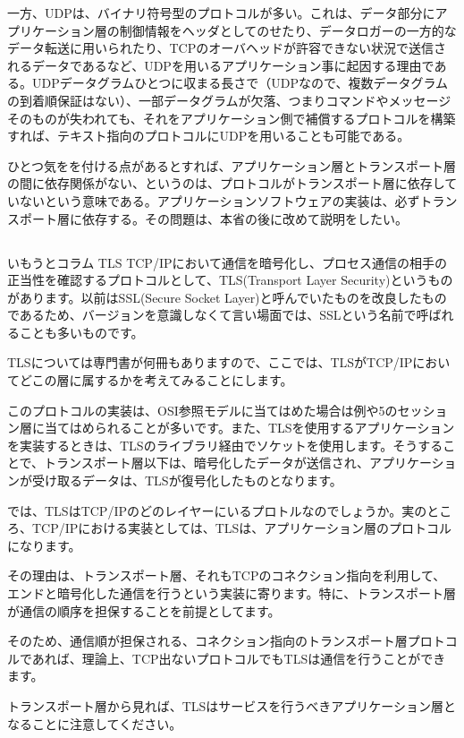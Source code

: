 一方、UDPは、バイナリ符号型のプロトコルが多い。これは、データ部分にアプリケーション層の制御情報をヘッダとしてのせたり、データロガーの一方的なデータ転送に用いられたり、TCPのオーバヘッドが許容できない状況で送信されるデータであるなど、UDPを用いるアプリケーション事に起因する理由である。UDPデータグラムひとつに収まる長さで（UDPなので、複数データグラムの到着順保証はない）、一部データグラムが欠落、つまりコマンドやメッセージそのものが失われても、それをアプリケーション側で補償するプロトコルを構築すれば、テキスト指向のプロトコルにUDPを用いることも可能である。

ひとつ気をを付ける点があるとすれば、アプリケーション層とトランスポート層の間に依存関係がない、というのは、プロトコルがトランスポート層に依存していないという意味である。アプリケーションソフトウェアの実装は、必ずトランスポート層に依存する。その問題は、本省の後に改めて説明をしたい。


\subsection*{}
\begin{itembox}[l]{いもうとコラム TLS}
TCP/IPにおいて通信を暗号化し、プロセス通信の相手の正当性を確認するプロトコルとして、TLS(Transport Layer Security)というものがあります。以前はSSL(Secure Socket Layer)と呼んでいたものを改良したものであるため、バージョンを意識しなくて言い場面では、SSLという名前で呼ばれることも多いものです。

TLSについては専門書が何冊もありますので、ここでは、TLSがTCP/IPにおいてどこの層に属するかを考えてみることにします。

このプロトコルの実装は、OSI参照モデルに当てはめた場合は例や5のセッション層に当てはめられることが多いです。また、TLSを使用するアプリケーションを実装するときは、TLSのライブラリ経由でソケットを使用します。そうすることで、トランスポート層以下は、暗号化したデータが送信され、アプリケーションが受け取るデータは、TLSが復号化したものとなります。

では、TLSはTCP/IPのどのレイヤーにいるプロトルなのでしょうか。実のところ、TCP/IPにおける実装としては、TLSは、アプリケーション層のプロトコルになります。

その理由は、トランスポート層、それもTCPのコネクション指向を利用して、エンドと暗号化した通信を行うという実装に寄ります。特に、トランスポート層が通信の順序を担保することを前提としてます。

そのため、通信順が担保される、コネクション指向のトランスポート層プロトコルであれば、理論上、TCP出ないプロトコルでもTLSは通信を行うことができます。

トランスポート層から見れば、TLSはサービスを行うべきアプリケーション層となることに注意してください。


\end{itembox}

